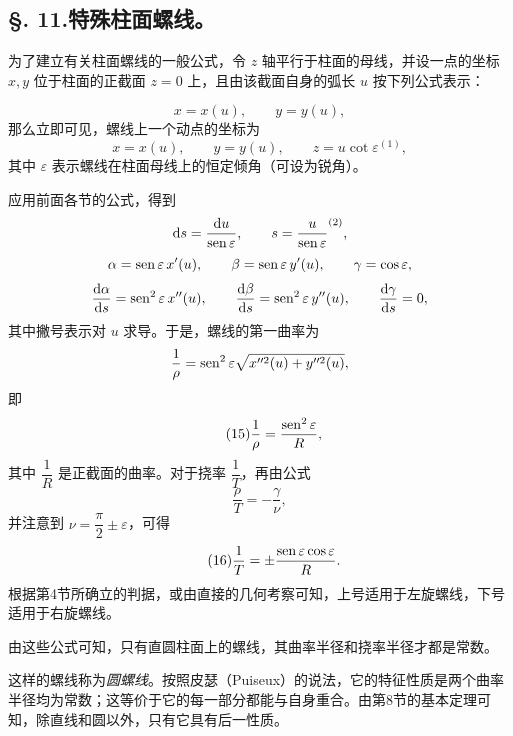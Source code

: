 \subsection*{\S. 11.\quad 特殊柱面螺线。}
为了建立有关柱面螺线的一般公式，令 \(z\) 轴平行于柱面的母线，并设一点的坐标 \(x,y\) 位于柱面的正截面 \(z=0\) 上，且由该截面自身的弧长 \(u\) 按下列公式表示：

\[
x=x(u),\qquad y=y(u),
\]
那么立即可见，螺线上一个动点的坐标为
\[
x=x(u),\qquad y=y(u),\qquad z=u\cot\varepsilon^{(1)},
\]
其中 \(\varepsilon\) 表示螺线在柱面母线上的恒定倾角（可设为锐角）。

应用前面各节的公式，得到
\[
\mathrm{d} s=\frac{\mathrm{d} u}{\operatorname{sen}\varepsilon},\qquad
s=\frac{u}{\operatorname{sen}\varepsilon}^{(2)},
\]
\[
\alpha=\operatorname{sen}\varepsilon\,x'(u),\qquad
\beta=\operatorname{sen}\varepsilon\,y'(u),\qquad
\gamma=\cos\varepsilon,
\]
\[
\frac{\mathrm{d}\alpha}{\mathrm{d} s}=\operatorname{sen}^2\varepsilon\,x''(u),\qquad
\frac{\mathrm{d}\beta}{\mathrm{d} s}=\operatorname{sen}^2\varepsilon\,y''(u),\qquad
\frac{\mathrm{d}\gamma}{\mathrm{d} s}=0,
\]
其中撇号表示对 \(u\) 求导。于是，螺线的第一曲率为
\[
\frac{1}{\rho}=\operatorname{sen}^2\varepsilon\sqrt{x''^2(u)+y''^2(u)},
\]
即
\begin{equation}\tag{15}
\frac{1}{\rho}=\frac{\operatorname{sen}^2\varepsilon}{R},
\end{equation}
其中 \(\dfrac{1}{R}\) 是正截面的曲率。对于挠率 \(\dfrac{1}{T}\)，再由公式
\[
\frac{\rho}{T}=-\frac{\gamma}{\nu},
\]
并注意到 \(\nu=\dfrac{\pi}{2}\pm\varepsilon\)，可得
\begin{equation}\tag{16}
\frac{1}{T}=\pm\frac{\operatorname{sen}\varepsilon\cos\varepsilon}{R}.
\end{equation}
根据第4节所确立的判据，或由直接的几何考察可知，上号适用于左旋螺线，下号适用于右旋螺线。

由这些公式可知，只有直圆柱面上的螺线，其曲率半径和挠率半径才都是常数。

这样的螺线称为\emph{圆螺线}。按照皮瑟（Puiseux）的说法，它的特征性质是两个曲率半径均为常数；这等价于它的每一部分都能与自身重合。由第8节的基本定理可知，除直线和圆以外，只有它具有后一性质。

